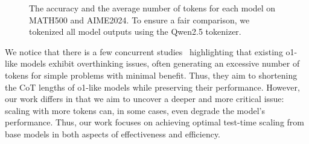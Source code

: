 \begin{figure*}[t]
  \centering
  \caption{The accuracy and the average number of tokens for each model on MATH500 and AIME2024. To ensure a fair comparison, we tokenized all model outputs using the Qwen2.5 tokenizer.}
  \label{fig: o1-like models acc and tokens}
  \vskip -0.05in
\end{figure*}


We notice that there is a few concurrent studies~\citep{o1-overthinking, o1-pruner} highlighting that existing o1-like models exhibit overthinking issues, often generating an excessive number of tokens for simple problems with minimal benefit. Thus, they aim to shortening the CoT lengths of o1-like models while preserving their performance. However, our work differs in that we aim to uncover a deeper and more critical issue: scaling with more tokens can, in some cases, even degrade the model's performance. Thus, our work focuses on achieving optimal test-time scaling from base models in both aspects of effectiveness and efficiency.